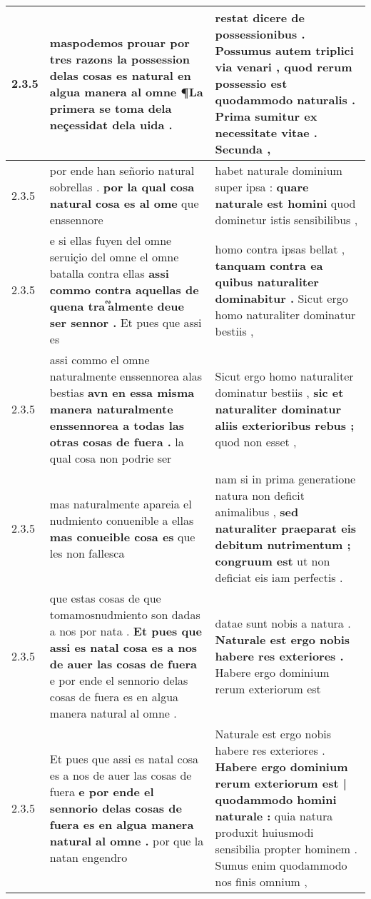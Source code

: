 \begin{tabular}{|p{1cm}|p{6.5cm}|p{6.5cm}|}
2.3.5 & maspodemos prouar \textbf{ por tres razons la possession delas cosas es natural en algua manera al omne } ¶La primera se toma dela neçessidat dela uida . & restat dicere de possessionibus . Possumus autem triplici via venari , \textbf{ quod rerum possessio est quodammodo naturalis . } Prima sumitur ex necessitate vitae . Secunda , \\\hline
2.3.5 & por ende han señorio natural sobrellas . \textbf{ por la qual cosa natural cosa es al ome } que enssennore & habet naturale dominium super ipsa : \textbf{ quare naturale est homini } quod dominetur istis sensibilibus , \\\hline
2.3.5 & e si ellas fuyen del omne seruiçio del omne el omne batalla contra ellas \textbf{ assi commo contra aquellas de quena tra ᷑almente deue ser sennor . } Et pues que assi es & homo contra ipsas bellat , \textbf{ tanquam contra ea quibus naturaliter dominabitur . } Sicut ergo homo naturaliter dominatur bestiis , \\\hline
2.3.5 & assi commo el omne naturalmente enssennorea alas bestias \textbf{ avn en essa misma manera naturalmente enssennorea a todas las otras cosas de fuera . } la qual cosa non podrie ser & Sicut ergo homo naturaliter dominatur bestiis , \textbf{ sic et naturaliter dominatur aliis exterioribus rebus ; } quod non esset , \\\hline
2.3.5 & mas naturalmente apareia el nudmiento conuenible a ellas \textbf{ mas conueible cosa es } que les non fallesca & nam si in prima generatione natura non deficit animalibus , \textbf{ sed naturaliter praeparat eis debitum nutrimentum ; congruum est } ut non deficiat eis iam perfectis . \\\hline
2.3.5 & que estas cosas de que tomamosnudmiento son dadas a nos por nata . \textbf{ Et pues que assi es natal cosa es a nos de auer las cosas de fuera } e por ende el sennorio delas cosas de fuera es en algua manera natural al omne . & datae sunt nobis a natura . \textbf{ Naturale est ergo nobis habere res exteriores . } Habere ergo dominium rerum exteriorum est \\\hline
2.3.5 & Et pues que assi es natal cosa es a nos de auer las cosas de fuera \textbf{ e por ende el sennorio delas cosas de fuera es en algua manera natural al omne . } por que la natan engendro & Naturale est ergo nobis habere res exteriores . \textbf{ Habere ergo dominium rerum exteriorum est | quodammodo homini naturale : } quia natura produxit huiusmodi sensibilia propter hominem . Sumus enim quodammodo nos finis omnium , \\\hline

\end{tabular}
